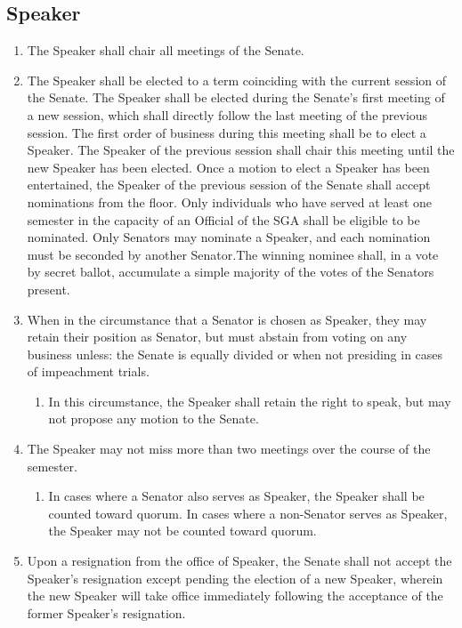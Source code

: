 \documentclass[12pt]{scrreprt}
\begin{document}
\subsection{Speaker}
\begin{enumerate}
    \item The Speaker shall chair all meetings of the Senate. 
    \item The Speaker shall be elected to a term coinciding with the current session of the Senate. The Speaker shall be elected during the Senate’s first meeting of a new session, which shall directly follow the last meeting of the previous session. The first order of business during this meeting shall be to elect a Speaker. The Speaker of the previous session shall chair this meeting until the new Speaker has been elected. Once a motion to elect a Speaker has been entertained, the Speaker of the previous session of the Senate shall accept nominations from the floor. Only individuals who have served at least one semester in the capacity of an Official of the SGA shall be eligible to be nominated. Only Senators may nominate a Speaker, and each nomination must be seconded by another Senator.The winning nominee shall, in a vote by secret ballot, accumulate a simple majority of the votes of the Senators present.
    \item When in the circumstance that a Senator is chosen as Speaker, they 
          may retain their position as Senator, but must abstain from voting 
          on any business unless: the Senate is equally divided or when not 
          presiding in cases of impeachment trials. 
        \begin{enumerate}
            \item In this circumstance, the Speaker shall retain the right to 
                  speak, but may not propose any motion to the Senate. 
        \end{enumerate}
    \item The Speaker may not miss more than two meetings over the course of 
          the semester. 
        \begin{enumerate}
            \item In cases where a Senator also serves as Speaker, the Speaker 
                  shall be counted toward quorum. In cases where a non-Senator 
                  serves as Speaker, the Speaker may not be counted toward 
                  quorum. 
        \end{enumerate}
    \item Upon a resignation from the office of Speaker, the Senate shall not accept the Speaker’s resignation except pending the election of a new Speaker, wherein the new Speaker will take office immediately following the acceptance of the former Speaker's resignation.
\end{enumerate}
\end{document}
